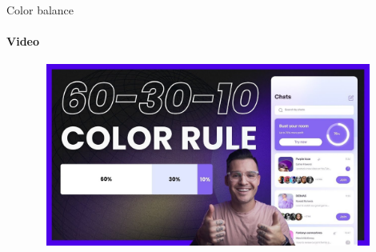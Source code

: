 \documentclass[aspectratio=169]{beamer}
\begin{document}
\begin{frame}[t]{Color balance}
    \framesubtitle{Video}
    \vspace{-0.6cm}
    \begin{figure}[H]
        \href{https://youtu.be/UWwNIMHFdW4}{
            \centering\includegraphics[height=6cm,width=1\textwidth,keepaspectratio]{color_video.jpg}}
        \label{fig:color_video.jpg}
    \end{figure}
\end{frame}
\end{document}
